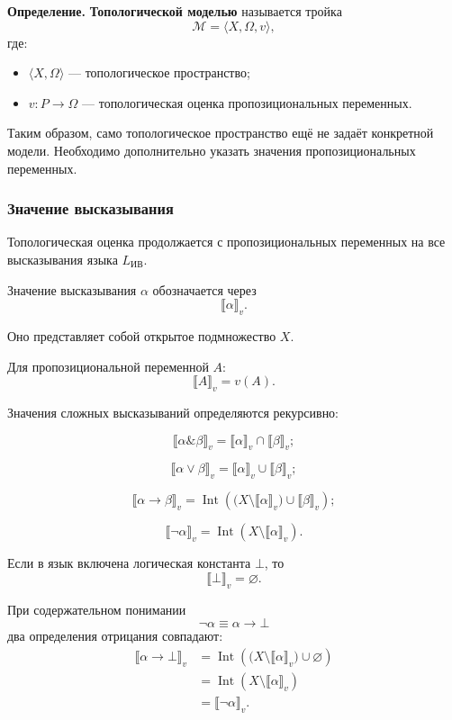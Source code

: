 \documentclass[12pt,a4paper,oneside,openany]{book}
\theoremstyle{definition}
\theoremstyle{plain}
\theoremstyle{remark}
\begin{document}
\textbf{Определение.}
\textbf{Топологической моделью} называется тройка
\[
\mathcal M
=
\langle X,\Omega,v\rangle,
\]
где:

\begin{itemize}
    \item \(\langle X,\Omega\rangle\) --- топологическое пространство;
    \item \(v:P\to\Omega\) --- топологическая оценка
          пропозициональных переменных.
\end{itemize}

Таким образом, само топологическое пространство ещё не задаёт
конкретной модели. Необходимо дополнительно указать значения
пропозициональных переменных.

\subsubsection{Значение высказывания}

Топологическая оценка продолжается с пропозициональных переменных на
все высказывания языка \(L_{\mathrm{ИВ}}\).

Значение высказывания \(\alpha\) обозначается через
\[
\llbracket\alpha\rrbracket_v.
\]

Оно представляет собой открытое подмножество \(X\).

Для пропозициональной переменной \(A\):
\[
\llbracket A\rrbracket_v=v(A).
\]

Значения сложных высказываний определяются рекурсивно:

\[
\llbracket
\alpha\mathbin{\&}\beta
\rrbracket_v
=
\llbracket\alpha\rrbracket_v
\cap
\llbracket\beta\rrbracket_v;
\]

\[
\llbracket
\alpha\lor\beta
\rrbracket_v
=
\llbracket\alpha\rrbracket_v
\cup
\llbracket\beta\rrbracket_v;
\]

\[
\llbracket
\alpha\to\beta
\rrbracket_v
=
\operatorname{Int}
\left(
\bigl(
X\setminus\llbracket\alpha\rrbracket_v
\bigr)
\cup
\llbracket\beta\rrbracket_v
\right);
\]

\[
\llbracket
\neg\alpha
\rrbracket_v
=
\operatorname{Int}
\left(
X\setminus\llbracket\alpha\rrbracket_v
\right).
\]

Если в язык включена логическая константа \(\bot\), то
\[
\llbracket\bot\rrbracket_v=\varnothing.
\]

При содержательном понимании
\[
\neg\alpha\equiv\alpha\to\bot
\]
два определения отрицания совпадают:
\[
\begin{aligned}
\llbracket\alpha\to\bot\rrbracket_v
&=
\operatorname{Int}
\left(
\bigl(
X\setminus\llbracket\alpha\rrbracket_v
\bigr)
\cup
\varnothing
\right)
\\
&=
\operatorname{Int}
\left(
X\setminus\llbracket\alpha\rrbracket_v
\right)
\\
&=
\llbracket\neg\alpha\rrbracket_v.
\end{aligned}
\]
\end{document}

